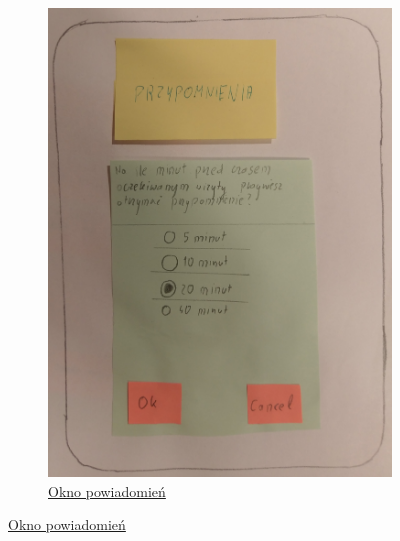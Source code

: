 \documentclass[12pt]{article}
\begin{document}
\begin{figure}[h!]
\begin{subfigure}[ba]{1\linewidth}
	\includegraphics[width=\linewidth]{zdj/6.jpg}
	\caption{\underline{Okno powiadomień}}
\end{subfigure}
\end{figure}
\end{document}
